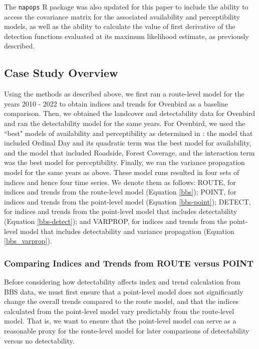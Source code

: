 \par The \texttt{napops} R package was also updated for this paper to include the ability to access the covariance matrix for the associated availability and perceptibility models, as well as the ability to calculate the value of first derivative of the detection functions evaluated at its maximum likelihood estimate, as previously described.

\subsection{Case Study Overview}

Using the methods as described above, we first ran a route-level model for the years 2010 - 2022 to obtain indices and trends for Ovenbird as a baseline comparison.
Then, we obtained the landcover and detectability data for Ovenbird and ran the detectability model for the same years.
For Ovenbird, we used the ``best" models of availability and perceptibility as determined in \citet{edwards_point_2023}: the model that included Ordinal Day and its quadratic term was the best model for availability, and the model that included Roadside, Forest Coverage, and the interaction term was the best model for perceptibility.
Finally, we ran the variance propagation model for the same years as above.
These model runs resulted in four sets of indices and hence four time series.
We denote them as follows: ROUTE, for indices and trends from the route-level model (Equation \ref{bbs}); POINT, for indices and trends from the point-level model (Equation \ref{bbs-point}); DETECT, for indices and trends from the point-level model that includes detectability (Equation \ref{bbs-detect}); and VARPROP, for indices and trends from the point-level model that includes detectability and variance propagation (Equation \ref{bbs_varprop}).

\subsubsection{Comparing Indices and Trends from ROUTE versus POINT}\label{route-vs-point}

\par Before considering how detectability affects index and trend calculation from BBS data, we must first ensure that a point-level model does not significantly change the overall trends compared to the route model, and that the indices calculated from the point-level model vary predictably from the route-level model.
That is, we want to ensure that the point-level model can serve as a reasonable proxy for the route-level model for later comparisons of detectability versus no detectability.

